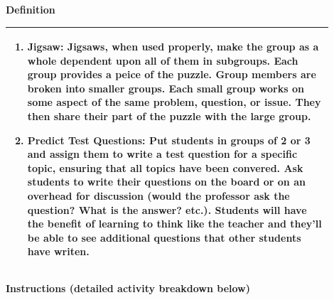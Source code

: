 \documentclass{article}
\begin{document}
{\large\textbf{Definition}}\\
\noindent
\begin{tabular}{|p{0.9\linewidth}|}
\hline
\begin{enumerate}
    \item\textbf{Jigsaw:} Jigsaws, when used properly, make the group as a whole dependent upon all of them in subgroups. Each group provides a peice of the puzzle. Group members are broken into smaller groups. Each small group works on some aspect of the same problem, question, or issue. They then share their part of the puzzle with the large group.
    \item\textbf{Predict Test Questions:}  Put students in groups of 2 or 3 and assign them to write a test question for a specific topic, ensuring that all topics have been convered. Ask students to write their questions on the board or on an overhead for discussion (would the professor ask the question? What is the answer? etc.). Students will have the benefit of learning to think like the teacher and they'll be able to see additional questions that other students have writen.
 
\end{enumerate} \\
\hline
\end{tabular}
\newpage

\vspace{0.5cm}
\noindent
{\large \textbf{Instructions (detailed activity breakdown below)}} \\
\end{document}
